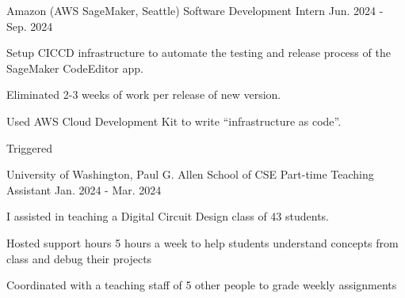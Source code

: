 \vspace{\sectionpadding}
\vspace{-0.5ex}
\vspace{-1.5ex}
\entry
    {Amazon (AWS SageMaker, Seattle)}
    {Software Development Intern}
    {Jun. 2024 - Sep. 2024}
    {
    Setup CICCD infrastructure to automate the testing and release process of the SageMaker CodeEditor app.
    \begin{condenseditemize}
        \item Eliminated 2-3 weeks of work per release of new version.
        \item Used AWS Cloud Development Kit to write ``infrastructure as code''.
        \item Triggered 
    \end{condenseditemize}
    }

\entry
    {University of Washington, Paul G. Allen School of CSE}
    {Part-time Teaching Assistant}
    {Jan. 2024 - Mar. 2024}
    {
    I assisted in teaching a Digital Circuit Design class of 43 students.
    \begin{condenseditemize}
        \item Hosted support hours 5 hours a week to help students understand concepts from class and debug their projects
        \item Coordinated with a teaching staff of 5 other people to grade weekly assignments
    \end{condenseditemize}
    }

